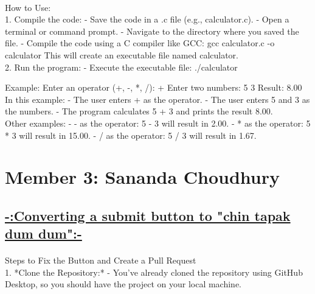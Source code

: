 \documentclass[a4paper,12pt]{article}
\begin{document}
\paragraph{}
How to Use:\\

1. Compile the code:
   - Save the code in a .c file (e.g., calculator.c).
   - Open a terminal or command prompt.
   - Navigate to the directory where you saved the file.
   - Compile the code using a C compiler like GCC:
     gcc calculator.c -o calculator
     This will create an executable file named calculator.\\

2. Run the program:
   - Execute the executable file:
     ./calculator

Example:
Enter an operator (+, -, *, /): +
Enter two numbers: 5 3
Result: 8.00\\

In this example:
- The user enters + as the operator.
- The user enters 5 and 3 as the numbers.
- The program calculates 5 + 3 and prints the result 8.00.\\

Other examples:
- - as the operator: 5 - 3 will result in 2.00.
- * as the operator: 5 * 3 will result in 15.00.
- / as the operator: 5 / 3 will result in 1.67.

\newpage

\section*{Member 3: Sananda Choudhury}
\date{\today}
\FloatBarrier 
\begin{center}
\section*{\uline{-:Converting a submit button to "chin tapak dum dum":-}}
\end{center}
\paragraph{}

Steps to Fix the Button and Create a Pull Request\\

1. *Clone the Repository:*
   - You’ve already cloned the repository using GitHub Desktop, so you should have the project on your local machine.\\
\end{document}
